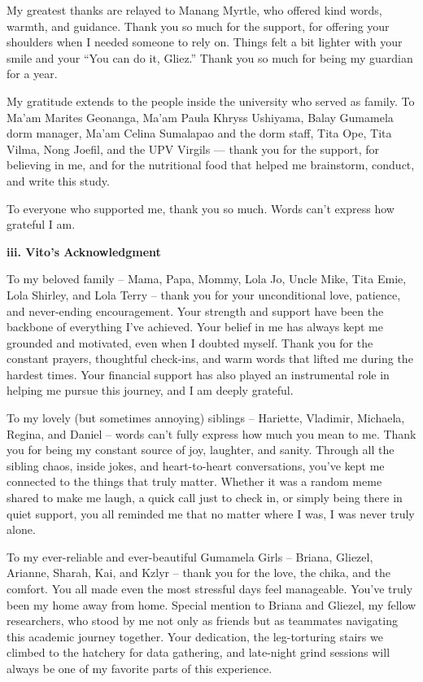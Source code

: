 My greatest thanks are relayed to Manang Myrtle, who offered kind words, warmth, and guidance. Thank you so much for the support, for offering your shoulders when I needed someone to rely on. Things felt a bit lighter with your smile and your “You can do it, Gliez.” Thank you so much for being my guardian for a year.

My gratitude extends to the people inside the university who served as family. To Ma’am Marites Geonanga, Ma’am Paula Khryss Ushiyama, Balay Gumamela dorm manager, Ma'am Celina Sumalapao and the dorm staff, Tita Ope, Tita Vilma, Nong Joefil, and the UPV Virgils — thank you for the support, for believing in me, and for the nutritional food that helped me brainstorm, conduct, and write this study.

To everyone who supported me, thank you so much. Words can’t express how grateful I am.

\vspace{0.5cm}
\noindent\textbf{iii. Vito's Acknowledgment} \\
\vspace{-0.5cm}

To my beloved family – Mama, Papa, Mommy, Lola Jo, Uncle Mike, Tita Emie, Lola Shirley, and Lola Terry – thank you for your unconditional love, patience, and never-ending encouragement. Your strength and support have been the backbone of everything I’ve achieved. Your belief in me has always kept me grounded and motivated, even when I doubted myself. Thank you for the constant prayers, thoughtful check-ins, and warm words that lifted me during the hardest times. Your financial support has also played an instrumental role in helping me pursue this journey, and I am deeply grateful.

To my lovely (but sometimes annoying) siblings – Hariette, Vladimir, Michaela, Regina, and Daniel – words can’t fully express how much you mean to me. Thank you for being my constant source of joy, laughter, and sanity. Through all the sibling chaos, inside jokes, and heart-to-heart conversations, you've kept me connected to the things that truly matter. Whether it was a random meme shared to make me laugh, a quick call just to check in, or simply being there in quiet support, you all reminded me that no matter where I was, I was never truly alone.

To my ever-reliable and ever-beautiful Gumamela Girls – Briana, Gliezel, Arianne, Sharah, Kai, and Kzlyr – thank you for the love, the chika, and the comfort. You all made even the most stressful days feel manageable. You’ve truly been my home away from home. Special mention to Briana and Gliezel, my fellow researchers, who stood by me not only as friends but as teammates navigating this academic journey together. Your dedication, the leg-torturing stairs we climbed to the hatchery for data gathering, and late-night grind sessions will always be one of my favorite parts of this experience.

